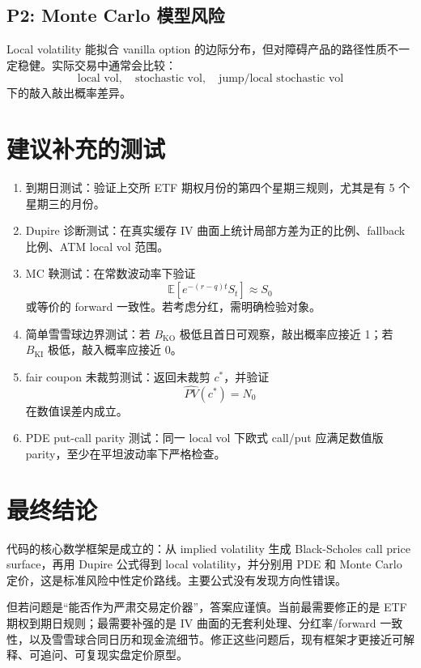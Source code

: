 \documentclass[UTF8,a4paper,11pt]{ctexart}
\begin{document}
\subsection{P2: Monte Carlo 模型风险}

Local volatility 能拟合 vanilla option 的边际分布，但对障碍产品的路径性质不一定稳健。实际交易中通常会比较：
\[
\text{local vol},\quad \text{stochastic vol},\quad \text{jump/local stochastic vol}
\]
下的敲入敲出概率差异。

\section{建议补充的测试}

\begin{enumerate}
  \item 到期日测试：验证上交所 ETF 期权月份的第四个星期三规则，尤其是有 5 个星期三的月份。
  \item Dupire 诊断测试：在真实缓存 IV 曲面上统计局部方差为正的比例、fallback 比例、ATM local vol 范围。
  \item MC 鞅测试：在常数波动率下验证
  \[
  \mathbb E[e^{-(r-q)t}S_t]\approx S_0
  \]
  或等价的 forward 一致性。若考虑分红，需明确检验对象。
  \item 简单雪雪球边界测试：若 \(B_{\mathrm{KO}}\) 极低且首日可观察，敲出概率应接近 1；若 \(B_{\mathrm{KI}}\) 极低，敲入概率应接近 0。
  \item fair coupon 未裁剪测试：返回未裁剪 \(c^\ast\)，并验证
  \[
  \widehat{PV}(c^\ast)=N_0
  \]
  在数值误差内成立。
  \item PDE put-call parity 测试：同一 local vol 下欧式 call/put 应满足数值版 parity，至少在平坦波动率下严格检查。
\end{enumerate}

\section{最终结论}

代码的核心数学框架是成立的：从 implied volatility 生成 Black-Scholes call price surface，再用 Dupire 公式得到 local volatility，并分别用 PDE 和 Monte Carlo 定价，这是标准风险中性定价路线。主要公式没有发现方向性错误。

但若问题是“能否作为严肃交易定价器”，答案应谨慎。当前最需要修正的是 ETF 期权到期日规则；最需要补强的是 IV 曲面的无套利处理、分红率/forward 一致性，以及雪雪球合同日历和现金流细节。修正这些问题后，现有框架才更接近可解释、可追问、可复现实盘定价原型。
\end{document}
